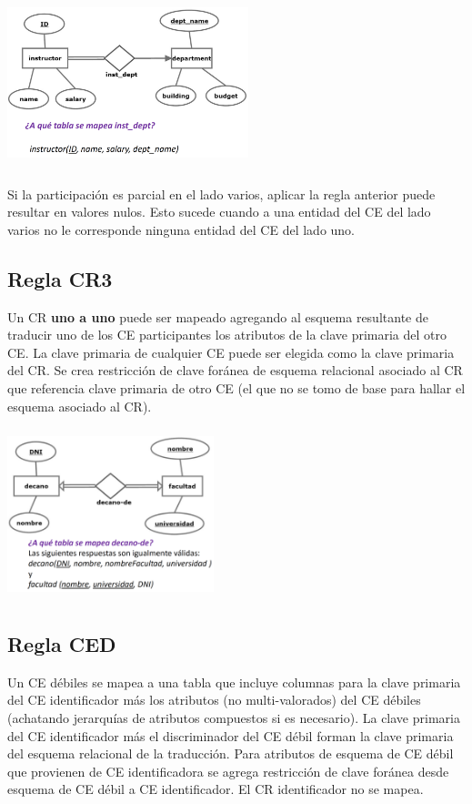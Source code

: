 \documentclass[12pt,a4paper]{report}
\begin{document}
			\begin{center}
				\includegraphics[width=7cm, height=5cm]{./imagenes/cr2.png}
			\end{center}

			\par Si la participación es parcial en el lado varios, aplicar la regla anterior puede resultar en valores nulos. Esto sucede cuando a una entidad del CE del lado varios no le corresponde ninguna entidad del CE del lado uno.
		
		\subsection{Regla CR3}
			\par Un CR \textbf{uno a uno} puede ser mapeado agregando al esquema resultante de traducir uno de los CE participantes los atributos de la clave primaria del otro CE. La clave primaria de cualquier CE puede ser elegida como la clave primaria del CR. Se crea restricción de clave foránea de esquema relacional asociado al CR que referencia clave primaria de otro CE (el que no se tomo de base para hallar el esquema asociado al CR).

			\begin{center}
				\includegraphics[width=6cm, height=5cm]{./imagenes/cr3.png}
			\end{center}

		\subsection{Regla CED}
			\par Un CE débiles se mapea a una tabla que incluye columnas para la clave primaria del CE identificador más los atributos (no multi-valorados) del CE débiles (achatando jerarquías de atributos compuestos si es necesario). La clave primaria del CE identificador más el discriminador del CE débil forman la clave primaria del esquema relacional de la traducción. Para atributos de esquema de CE débil que provienen de CE identificadora se agrega restricción de clave foránea desde esquema de CE débil a CE identificador. El CR identificador no se mapea.
\end{document}
